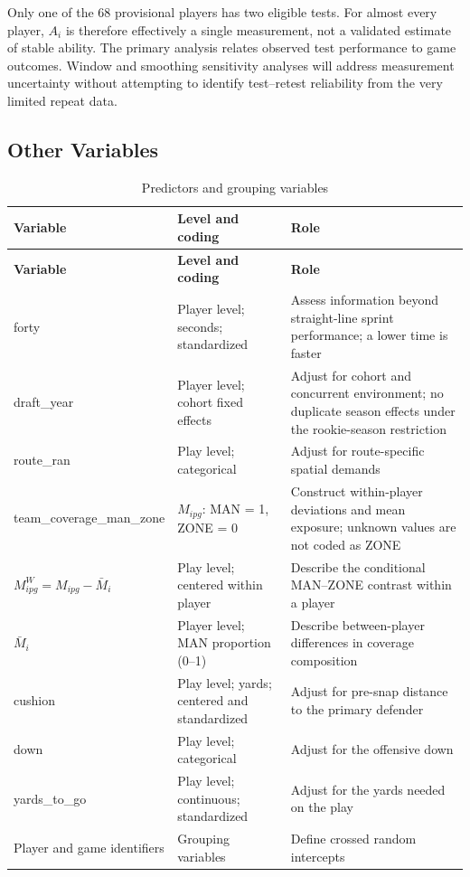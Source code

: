 \documentclass[a4paper,11pt]{article}
\newcommand{\code}[1]{{\small\ttfamily #1}}
\newlength{\tablecontentwidth}
\begin{document}
Only one of the 68 provisional players has two eligible tests. For almost every player, $A_i$ is therefore effectively a single measurement, not a validated estimate of stable ability. The primary analysis relates observed test performance to game outcomes. Window and smoothing sensitivity analyses will address measurement uncertainty without attempting to identify test--retest reliability from the very limited repeat data.

\subsection{Other Variables}

{\small
\begin{longtable}{@{}P{0.3\tablecontentwidth}P{0.29\tablecontentwidth}P{0.41\tablecontentwidth}@{}}
\caption{Predictors and grouping variables}\label{tab:3}\\
\toprule
\textbf{Variable} & \textbf{Level and coding} & \textbf{Role} \\
\midrule
\endfirsthead
\toprule
\textbf{Variable} & \textbf{Level and coding} & \textbf{Role} \\
\midrule
\endhead
\bottomrule
\endlastfoot
\code{forty} & Player level; seconds; standardized & Assess information beyond straight-line sprint performance; a lower time is faster \\[.15em]
\code{draft\_\allowbreak{}year} & Player level; cohort fixed effects & Adjust for cohort and concurrent environment; no duplicate season effects under the rookie-season restriction \\[.15em]
\code{route\_\allowbreak{}ran} & Play level; categorical & Adjust for route-specific spatial demands \\[.15em]
\code{team\_\allowbreak{}coverage\_\allowbreak{}man\_\allowbreak{}zone} & $M_{ipg}$: MAN = 1, ZONE = 0 & Construct within-player deviations and mean exposure; unknown values are not coded as ZONE \\[.15em]
$M^W_{ipg}=M_{ipg}-\bar M_i$ & Play level; centered within player & Describe the conditional MAN--ZONE contrast within a player \\[.15em]
$\bar M_i$ & Player level; MAN proportion (0--1) & Describe between-player differences in coverage composition \\[.15em]
\code{cushion} & Play level; yards; centered and standardized & Adjust for pre-snap distance to the primary defender \\[.15em]
\code{down} & Play level; categorical & Adjust for the offensive down \\[.15em]
\code{yards\_\allowbreak{}to\_\allowbreak{}go} & Play level; continuous; standardized & Adjust for the yards needed on the play \\[.15em]
Player and game identifiers & Grouping variables & Define crossed random intercepts \\[.15em]
\end{longtable}
}
\end{document}
